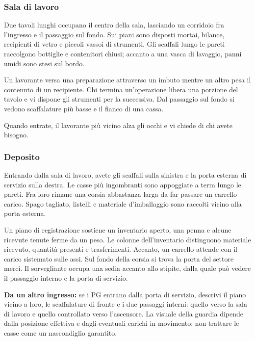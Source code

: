 \documentclass[11pt,a4paper]{article}
\begin{document}
\subsubsection{Sala di lavoro}
\begin{readaloud}
Due tavoli lunghi occupano il centro della sala, lasciando un corridoio fra l'ingresso e il passaggio sul fondo. Sui piani sono disposti mortai, bilance, recipienti di vetro e piccoli vassoi di strumenti. Gli scaffali lungo le pareti raccolgono bottiglie e contenitori chiusi; accanto a una vasca di lavaggio, panni umidi sono stesi sul bordo.

Un lavorante versa una preparazione attraverso un imbuto mentre un altro pesa il contenuto di un recipiente. Chi termina un'operazione libera una porzione del tavolo e vi dispone gli strumenti per la successiva. Dal passaggio sul fondo si vedono scaffalature più basse e il fianco di una cassa.

Quando entrate, il lavorante più vicino alza gli occhi e vi chiede di chi avete bisogno.
\end{readaloud}

\subsubsection{Deposito}
\begin{readaloud}
Entrando dalla sala di lavoro, avete gli scaffali sulla sinistra e la porta esterna di servizio sulla destra. Le casse più ingombranti sono appoggiate a terra lungo le pareti. Fra loro rimane una corsia abbastanza larga da far passare un carrello carico. Spago tagliato, listelli e materiale d'imballaggio sono raccolti vicino alla porta esterna.

Un piano di registrazione sostiene un inventario aperto, una penna e alcune ricevute tenute ferme da un peso. Le colonne dell'inventario distinguono materiale ricevuto, quantità presenti e trasferimenti. Accanto, un carrello attende con il carico sistemato sulle assi. Sul fondo della corsia si trova la porta del settore merci. Il sorvegliante occupa una sedia accanto allo stipite, dalla quale può vedere il passaggio interno e la porta di servizio.
\end{readaloud}

\textbf{Da un altro ingresso:} se i PG entrano dalla porta di servizio, descrivi il piano vicino a loro, le scaffalature di fronte e i due passaggi interni: quello verso la sala di lavoro e quello controllato verso l'ascensore. La visuale della guardia dipende dalla posizione effettiva e dagli eventuali carichi in movimento; non trattare le casse come un nascondiglio garantito.
\end{document}
